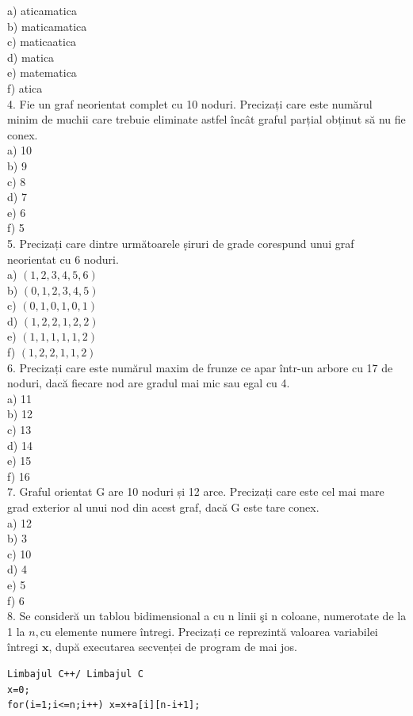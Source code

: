 \documentclass[10pt]{article}
\begin{document}
a) aticamatica\\
b) maticamatica\\
c) maticaatica\\
d) matica\\
e) matematica\\
f) atica\\
4. Fie un graf neorientat complet cu 10 noduri. Precizați care este numărul minim de muchii care trebuie eliminate astfel încât graful parțial obținut să nu fie conex.\\
a) 10\\
b) 9\\
c) 8\\
d) 7\\
e) 6\\
f) 5\\
5. Precizați care dintre următoarele ș̦iruri de grade corespund unui graf neorientat cu 6 noduri.\\
a) $(1,2,3,4,5,6)$\\
b) $(0,1,2,3,4,5)$\\
c) $(0,1,0,1,0,1)$\\
d) $(1,2,2,1,2,2)$\\
e) $(1,1,1,1,1,2)$\\
f) $(1,2,2,1,1,2)$\\
6. Precizați care este numărul maxim de frunze ce apar într-un arbore cu 17 de noduri, dacă fiecare nod are gradul mai mic sau egal cu 4.\\
a) 11\\
b) 12\\
c) 13\\
d) 14\\
e) 15\\
f) 16\\
7. Graful orientat G are 10 noduri și 12 arce. Precizați care este cel mai mare grad exterior al unui nod din acest graf, dacă G este tare conex.\\
a) 12\\
b) 3\\
c) 10\\
d) 4\\
e) 5\\
f) 6\\
8. Se consideră un tablou bidimensional a cu n linii şi n coloane, numerotate de la 1 la $n, \mathrm{cu}$ elemente numere întregi. Precizați ce reprezintă valoarea variabilei întregi $\mathbf{x}$, după executarea secvenței de program de mai jos.

\begin{verbatim}
Limbajul C++/ Limbajul C
x=0;
for(i=1;i<=n;i++) x=x+a[i][n-i+1];
\end{verbatim}
\end{document}
